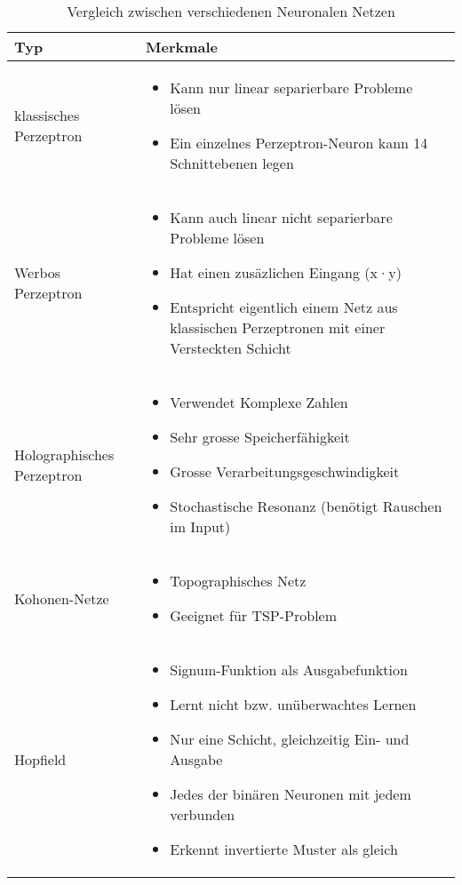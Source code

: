 \begin{table}[!h]
	\begin{tabularx}{\textwidth}{l | X}
		Typ & Merkmale \\
		\hline
		klassisches Perzeptron &
		\vspace{-2.5mm}
		\begin{itemize}
			\item Kann nur linear separierbare Probleme lösen
			\item Ein einzelnes Perzeptron-Neuron kann 14 Schnittebenen legen
		\end{itemize}
		\\
		Werbos Perzeptron &
		\vspace{-2.5mm}
		\begin{itemize}
			\item Kann auch linear nicht separierbare Probleme lösen
			\item Hat einen zusäzlichen Eingang (x·y)
			\item Entspricht eigentlich einem Netz aus klassischen Perzeptronen mit einer
				Versteckten Schicht
		\end{itemize}
		\\
		Holographisches Perzeptron &
		\vspace{-2.5mm}
		\begin{itemize}
			\item Verwendet Komplexe Zahlen
			\item Sehr grosse Speicherfähigkeit
			\item Grosse Verarbeitungsgeschwindigkeit
			\item Stochastische Resonanz (benötigt Rauschen im Input)
		\end{itemize}
		\\
		Kohonen-Netze &
		\vspace{-2.5mm}
		\begin{itemize}
			\item Topographisches Netz
			\item Geeignet für TSP-Problem
		\end{itemize}
		\\
		Hopfield &
		\vspace{-2.5mm}
		\begin{itemize}
			\item Signum-Funktion als Ausgabefunktion
			\item Lernt nicht bzw. unüberwachtes Lernen
			\item Nur eine Schicht, gleichzeitig Ein- und Ausgabe
			\item Jedes der binären Neuronen mit jedem verbunden
			\item Erkennt invertierte Muster als gleich
		\end{itemize}
	\end{tabularx}
	\caption{Vergleich zwischen verschiedenen Neuronalen Netzen}
	\label{tab:nnetze}
\end{table}

